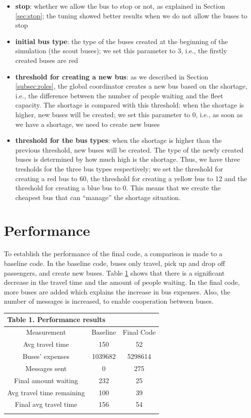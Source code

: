 \documentclass{article}
\begin{document}
\begin{itemize}
\item \textbf{stop}: whether we allow the bus to stop or not, as explained in Section \ref{sec:stop}; the tuning showed better results when we do not allow the buses to stop
\item \textbf{initial bus type}: the type of the buses created at the beginning of the simulation (the scout buses); we set this parameter to 3, i.e., the firstly created buses are red
\item \textbf{threshold for creating a new bus}: as we described in Section \ref{subsec:roles}, the global coordinator creates a new bus based on the shortage, i.e., the difference between the number of people waiting and the fleet capacity. The shortage is compared with this threshold: when the shortage is higher, new buses will be created; we set this parameter to 0, i.e., as soon as we have a shortage, we need to create new buses
\item \textbf{threshold for the bus types}: when the shortage is higher than the previous threshold, new buses will be created. The type of the newly created buses is determined by how much high is the shortage. Thus, we have three tresholds for the three bus types respectively; we set the threshold for creating a red bus to 60, the threshold for creating a yellow bus to 12 and the threshold for creating a blue bus to 0. This means that we create the cheapest bus that can ``manage'' the shortage situation. 
\end{itemize}

\section{Performance}

To establish the performance of the final code, a comparison is made to a baseline code. In the baseline code, buses only travel, pick up and drop off passengers, and create new buses. Table \ref{table:table1} shows that there is a significant decrease in the travel time and the amount of people waiting. In the final code, more buses are added which explains the increase in bus expenses. Also, the number of messages is increased, to enable cooperation between buses. 

\begin{table}
\begin{tabular}{ |c|c|c|  }
 \hline
 \multicolumn{4}{|l|}{Table 1. Performance results} \\
 \hline
  Measurement & Baseline & Final Code \\
 \hline
  Avg travel time & 150 & 52 \\
  Buses' expenses & 1039682 & 5298614 \\
  Messages sent & 0 & 275  \\
  Final amount waiting & 232 & 25 \\
  Avg travel time remaining & 100 & 39 \\
  Final avg travel time & 156 & 54 \\
 \hline
\label{table:table1}
\end{tabular}
\end{table}
\end{document}
